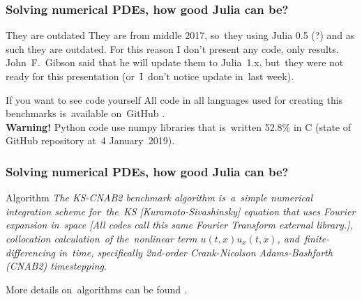 \documentclass{beamer}  %
\begin{document}
\begin{frame}
  \frametitle{Solving numerical PDEs, how good Julia can be?}

  \begin{block}{They are outdated}
    They are from middle 2017, so~they using Julia 0.5 (?) and as such
    they are outdated. For this reason I don't present any code, only
    results. John~F.~Gibson said that he will update them to
    Julia~1.x, but~they were not ready for this presentation
    (or~I~don't notice update in~last week).
  \end{block}

  \begin{block}{If you want to see code yourself}
    All code in all languages used for creating this benchmarks
    is~available on~GitHub . \\
    \textbf{Warning!} Python code use numpy libraries that is~written
    52.8\% in C (state of GitHub repository at~4 January~2019).
  \end{block}


\end{frame}


\begin{frame}
  \frametitle{Solving numerical PDEs, how good Julia can be?}

  \begin{block}{Algorithm}
    \emph{The KS-CNAB2 benchmark algorithm is~a~simple numerical
      integration scheme for~the~KS [Kuramoto-Sivashinsky] equation
      that uses Fourier expansion in~space [All codes call this same
      Fourier Transform external library.], collocation calculation~of
      the~nonlinear term $u( t, x ) u_{ x }( t, x )$,
      and~finite-differencing in~time, specifically 2nd-order
      Crank-Nicolson Adams-Bashforth
      (CNAB2) timestepping.} \\
  \end{block}

  \begin{block}{}
    More details on~algorithms can be found
    .
  \end{block}

\end{frame}
\end{document}

